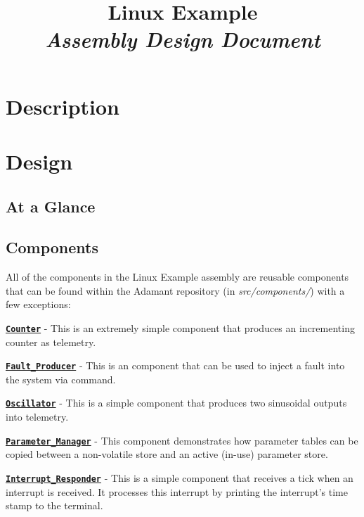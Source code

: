 



\title{\textbf{Linux Example} \\
\large\textit{Assembly Design Document}}
\date{}
\maketitle

\section{Description}


\section{Design}

\subsection{At a Glance}


\subsection{Components}
All of the components in the Linux Example assembly are reusable components that can be found within the Adamant repository (in \textit{src/components/}) with a few exceptions:

\vspace{5mm} %
\begin{spaceditemize}
  \item \textbf{\texttt{\url{Counter}}} - This is an extremely simple component that produces an incrementing counter as telemetry.
  \item \textbf{\texttt{\url{Fault_Producer}}} - This is an component that can be used to inject a fault into the system via command.
  \item \textbf{\texttt{\url{Oscillator}}} - This is a simple component that produces two sinusoidal outputs into telemetry. 
  \item \textbf{\texttt{\url{Parameter_Manager}}} - This component demonstrates how parameter tables can be copied between a non-volatile store and an active (in-use) parameter store.
  \item \textbf{\texttt{\url{Interrupt_Responder}}} - This is a simple component that receives a tick when an interrupt is received. It processes this interrupt by printing the interrupt's time stamp to the terminal.
\end{spaceditemize}
\vspace{5mm} %

